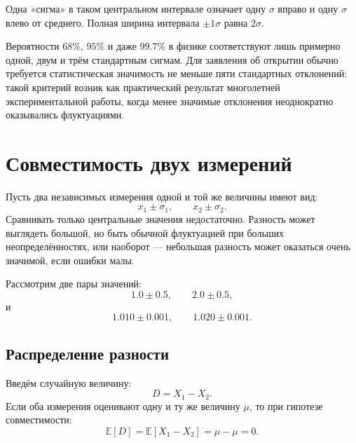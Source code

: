 \documentclass[
  russian,
  12pt,
  a4paper,
  a4paper,
  openany]{scrbook}
\begin{document}
\begin{booknote}

Одна «сигма» в таком центральном интервале означает одну \(\sigma\)
вправо и одну \(\sigma\) влево от среднего. Полная ширина интервала
\(\pm1\sigma\) равна \(2\sigma\).

\end{booknote}

Вероятности \(68\%\), \(95\%\) и даже \(99.7\%\) в физике соответствуют
лишь примерно одной, двум и трём стандартным сигмам. Для заявления об
открытии обычно требуется статистическая значимость не меньше пяти
стандартных отклонений: такой критерий возник как практический результат
многолетней экспериментальной работы, когда менее значимые отклонения
неоднократно оказывались флуктуациями.

\section{Совместимость двух
измерений}\label{ux441ux43eux432ux43cux435ux441ux442ux438ux43cux43eux441ux442ux44c-ux434ux432ux443ux445-ux438ux437ux43cux435ux440ux435ux43dux438ux439}

Пусть два независимых измерения одной и той же величины имеют вид:
\[x_1\pm\sigma_1,
\qquad
x_2\pm\sigma_2.\] Сравнивать только центральные значения недостаточно.
Разность может выглядеть большой, но быть обычной флуктуацией при
больших неопределённостях, или наоборот --- небольшая разность может
оказаться очень значимой, если ошибки малы.

Рассмотрим две пары значений: \[1.0\pm0.5,
\qquad
2.0\pm0.5,\] и \[1.010\pm0.001,
\qquad
1.020\pm0.001.\]

\subsection{Распределение
разности}\label{ux440ux430ux441ux43fux440ux435ux434ux435ux43bux435ux43dux438ux435-ux440ux430ux437ux43dux43eux441ux442ux438}

Введём случайную величину: \[D=X_1-X_2.\] Если оба измерения оценивают
одну и ту же величину \(\mu\), то при гипотезе совместимости:
\[\mathbb{E}[D]=\mathbb{E}[X_1-X_2]=\mu-\mu=0.\]
\end{document}
